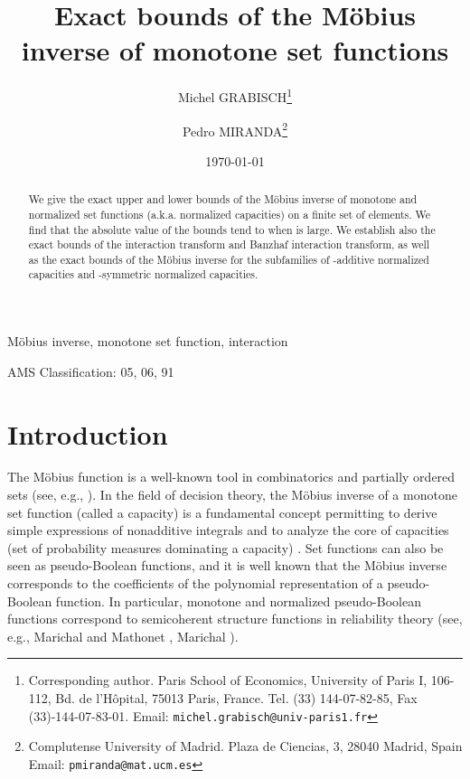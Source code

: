 \documentclass[12pt,a4paper]{article}
\theoremstyle{definition}
\theoremstyle{remark}
\begin{document}
\title{\bf\Large Exact bounds of the M\"obius inverse of monotone set functions}

\author{Michel GRABISCH\thanks{Corresponding author. Paris School of Economics,
          University of Paris I,
         106-112, Bd. de l'H\^opital, 75013 Paris, France. Tel. (33)
        144-07-82-85, Fax (33)-144-07-83-01. Email:
         \texttt{michel.grabisch@univ-paris1.fr}}       \and Pedro
         MIRANDA\thanks{Complutense University of Madrid. Plaza de Ciencias, 3,
           28040 Madrid, Spain Email:
       \texttt{pmiranda@mat.ucm.es}}
}

\date{\today}

\maketitle


\begin{abstract}
We give the exact upper and lower bounds of the M\"obius inverse of monotone and
normalized set functions (a.k.a. normalized capacities) on a finite set of 
elements. We find that the absolute value of the bounds tend to
 when  is large. We establish also the exact bounds of
the interaction transform and Banzhaf interaction transform, as well as the
exact bounds of the M\"obius inverse for the subfamilies of -additive normalized
capacities and -symmetric normalized capacities.
\end{abstract}


 M\"obius inverse, monotone set function, interaction

\noindent AMS Classification: 05, 06, 91

\section{Introduction}
The M\"obius function is a well-known tool in combinatorics and partially
ordered sets (see, e.g., \cite{aig79,lin97,rot64}). In the field of
decision theory, the M\"obius inverse of a monotone set function (called a
capacity) is a fundamental concept permitting to derive simple expressions of
nonadditive integrals and to analyze the core of capacities (set of probability
measures dominating a capacity) \cite{chja89}. Set functions can also be seen as
pseudo-Boolean functions, and it is well known that the M\"obius inverse
corresponds to the coefficients of the polynomial representation of a
pseudo-Boolean function.  In particular, monotone and normalized
  pseudo-Boolean functions correspond to semicoherent structure functions in
  reliability theory (see, e.g., Marichal and Mathonet \cite{mama13}, Marichal
  \cite{mar14}). 
\end{document}
